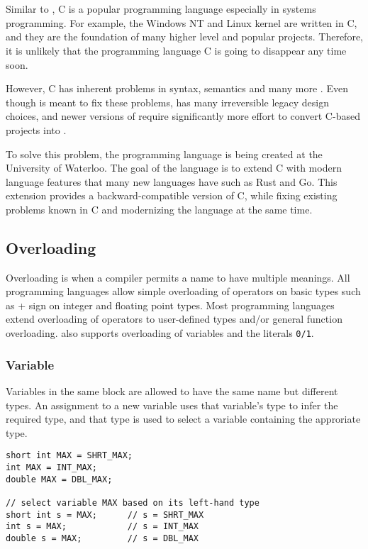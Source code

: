 \chapter{\CFA} \label{CFA}
Similar to \CC, C is a popular programming language especially in systems
programming. For example, the Windows NT and Linux kernel are written in C, and they are the foundation of many higher level
and popular projects. Therefore, it is unlikely that the programming language C is
going to disappear any time soon.

However, C has inherent problems in syntax, semantics and many
more \cite{reference2}. Even though \CCS is meant to fix these problems, \CCS has many
irreversible legacy design choices, and newer versions of \CCS require significantly more effort to convert C-based projects into \CC.

To solve this problem, the programming language \CFAS is being created at the University of Waterloo. The goal
of the language is to extend C with modern language features that many new
languages have such as Rust and Go. This extension provides a
backward-compatible version of C, while fixing existing problems known in C and
modernizing the language at the same time.

\section{Overloading}
Overloading is when a compiler permits a name to have multiple meanings. All
programming languages allow simple overloading of operators on basic types such
as + sign on integer and floating point types. Most programming languages extend
overloading of operators to user-defined types and/or general function
overloading. \CFAS also supports overloading of variables and the literals \verb|0/1|.

\subsection{Variable}
Variables in the same block are allowed to have the same name but different
types. An assignment to a new variable uses that variable's type to infer the
required type, and that type is used to select a variable containing the approriate type.

\begin{lstlisting}[style=C++nokeyword, caption={Overloading variables in \CFA}, label={CFA-overload-var}]
short int MAX = SHRT_MAX;
int MAX = INT_MAX;
double MAX = DBL_MAX;

// select variable MAX based on its left-hand type
short int s = MAX;      // s = SHRT_MAX
int s = MAX;            // s = INT_MAX
double s = MAX;         // s = DBL_MAX
\end{lstlisting}

